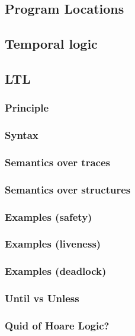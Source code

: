 \documentclass[12pt, a4paper]{book}
\begin{document}
  \subsection{Program Locations}
  \label{sub:Program Locations}
  \subsection{Temporal logic}
  \label{sub:Temporal logic}
  \subsection{LTL}
  \label{sub:LTL}
  \subsubsection{Principle}
  \label{subs:Principle}
  \subsubsection{Syntax}
  \label{subs:Syntax}
  \subsubsection{Semantics over traces}
  \label{subs:Semantics over traces}
  \subsubsection{Semantics over structures}
  \label{subs:Semantics over structures}
  \subsubsection{Examples (safety)}
  \label{subs:Examples (safety)}
  \subsubsection{Examples (liveness)}
  \label{subs:Examples (liveness)}
  \subsubsection{Examples (deadlock)}
  \label{subs:Examples (deadlock)}
  \subsubsection{Until vs Unless}
  \label{subs:Until vs Unless}
  \subsubsection{Quid of Hoare Logic?}
  \label{subs:Quid of Hoare Logic?}
\end{document}
